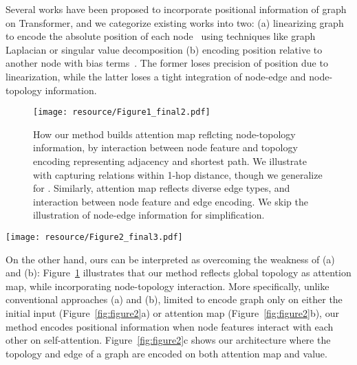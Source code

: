 \documentclass[letterpaper]{article} \usepackage{aaai23}  \usepackage{times}  \usepackage{helvet}  \usepackage{courier}  \usepackage[hyphens]{url}  \usepackage{graphicx} \urlstyle{rm} \def\UrlFont{\rm}  \usepackage{natbib}  \usepackage{caption} \frenchspacing  \setlength{\pdfpagewidth}{8.5in} \setlength{\pdfpageheight}{11in} \usepackage{algorithm}
\newcommand{\ie}{\textit{i.e.}}
\begin{document}
Several works have been proposed to incorporate positional information of graph on Transformer, and we
categorize existing works into two: (a) linearizing graph to encode the absolute position of each node~\citep{gt_dwivedi2020generalization,san_kreuzer2021rethinking} using techniques like graph Laplacian or singular value decomposition (b) encoding position relative to another node with bias terms~\citep{ying2021transformers}. 
The former loses precision of position due to linearization, while the latter loses a tight integration of node-edge and node-topology information.






\begin{figure}[t]
\centering\texttt{[image: resource/Figure1\_final2.pdf]}
\vspace{-5.2cm}
\caption{
How our method builds attention map  reflcting node-topology information, by interaction between node feature  and topology encoding  representing adjacency and shortest path.
We illustrate with  capturing
relations within 1-hop distance, though we generalize for .
Similarly, attention map  reflects diverse edge types, and interaction between node feature and edge encoding.
 We skip the illustration of node-edge information for simplification.
}
\label{fig:teaser}
\end{figure}


\begin{figure*}[t]
\centering\texttt{[image: resource/Figure2\_final3.pdf]}
\vspace{-5.2cm}
\caption{
Contrasting ours from previous approaches by where graph positional information is encoded, \ie, components marked in red.
Existing works either (a) linearize a graph to obtain absolute positional encoding for initial inputs or (b) add bias terms for attention map. 
On the other hand, \textbf{(c) our method} encodes on both attention map and value, capturing node-topology and node-edge relations.
We skip the illustration of edge encoding for simplification.
}
\label{fig:figure2}
\end{figure*}



On the other hand, ours can be interpreted as overcoming the weakness of (a) and (b):
 Figure~\ref{fig:teaser} illustrates that our method reflects global topology as attention map, while incorporating node-topology interaction.
More specifically, unlike conventional approaches (a) and (b),  limited to encode graph only on either the initial input (Figure~\ref{fig:figure2}a) or attention map (Figure~\ref{fig:figure2}b),
our method  encodes positional information when node features interact with each other on self-attention.
Figure~\ref{fig:figure2}c shows our architecture where the topology and edge of a graph are encoded on both attention map and value.
\end{document}
